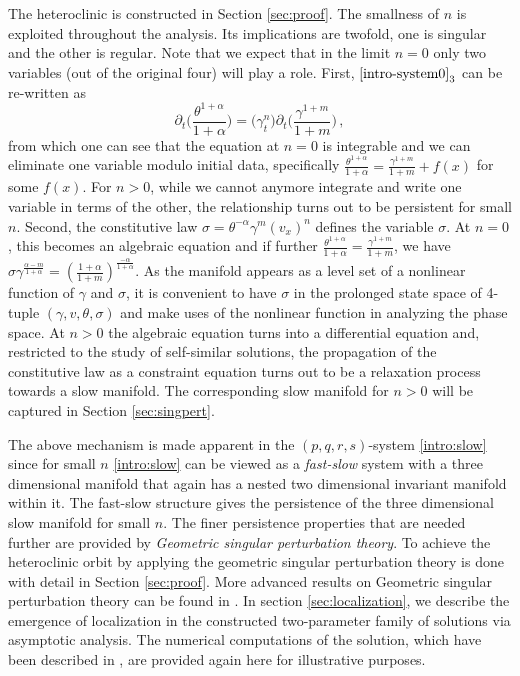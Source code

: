 \documentclass[a4paper,11pt]{article}
\theoremstyle{remark}
\begin{document}
The heteroclinic is constructed in Section \ref{sec:proof}.
The smallness of $n$ is exploited throughout the analysis. Its implications are twofold, one is singular and the other is regular. 
Note that we expect that in the limit $n=0$ only two variables (out of the original four) will play a role.
First, $\eqref{intro-system0}_3$ can be re-written as
$$ \partial_t\Big(\frac{\theta^{1+\alpha}}{1+\alpha}\Big) = \big(\gamma_t^n\big)\partial_t\Big(\frac{\gamma^{1+m}}{1+m}\Big) \, , $$
from which one can see that the equation at $n=0$ is integrable and we can eliminate one variable modulo initial data, specifically $\frac{\theta^{1+\alpha}}{1+\alpha} = \frac{\gamma^{1+m}}{1+m} + f(x)$ for some $f(x)$. For $n>0$, while we cannot anymore integrate and write one variable in terms of the other, the relationship turns out to be persistent for small $n$.
Second, the constitutive law 
$\sigma=\theta^{-\alpha}\gamma^m(v_x)^n$ defines the variable $\sigma$. At $n=0$, this becomes an algebraic equation and if further $\frac{\theta^{1+\alpha}}{1+\alpha} = \frac{\gamma^{1+m}}{1+m}$, we have $\sigma\gamma^{\tfrac{\alpha-m}{1+\alpha}}=\left(\tfrac{1+\alpha}{1+m}\right)^{\tfrac{-\alpha}{1+\alpha}} $. As the manifold appears as a level set of a nonlinear function of $\gamma$ and $\sigma$, it is convenient to have $\sigma$ in the prolonged state space of 4-tuple $(\gamma,v,\theta,\sigma)$ and make uses of the nonlinear function in analyzing the phase space. At $n>0$ the algebraic equation turns into a differential equation and, restricted to the study of self-similar solutions, the propagation of the constitutive law as a constraint equation turns out to be a relaxation process towards a slow manifold. The corresponding slow manifold for $n>0$ will be captured in Section \ref{sec:singpert}. 

The above mechanism is made apparent in the $(p,q,r,s)$-system \eqref{intro:slow} since for small $n$ \eqref{intro:slow} can be viewed as a {\it fast-slow} system with a three dimensional manifold that again has a nested two dimensional invariant manifold within it. The fast-slow structure gives the persistence of the three dimensional slow manifold for small $n$. The finer persistence properties that are needed further are provided by {\it Geometric singular perturbation theory}. To achieve the heteroclinic orbit by applying the geometric singular perturbation theory is done with detail in Section \ref{sec:proof}. More advanced results on Geometric singular perturbation theory can be found in \cite{fenichel_asymptotic_1974, fenichel_asymptotic_1977,fenichel_geometric_1979,HPS_1977,Sz1991,wiggins_normally_1994,Jones_1995,KUEHN_2015}.
In section \ref{sec:localization}, we describe the emergence of localization in the constructed two-parameter family of solutions via asymptotic analysis. The numerical computations of the solution, which have been described in \cite{KLT_HYP2016}, are provided again here for illustrative purposes. 
\end{document}
